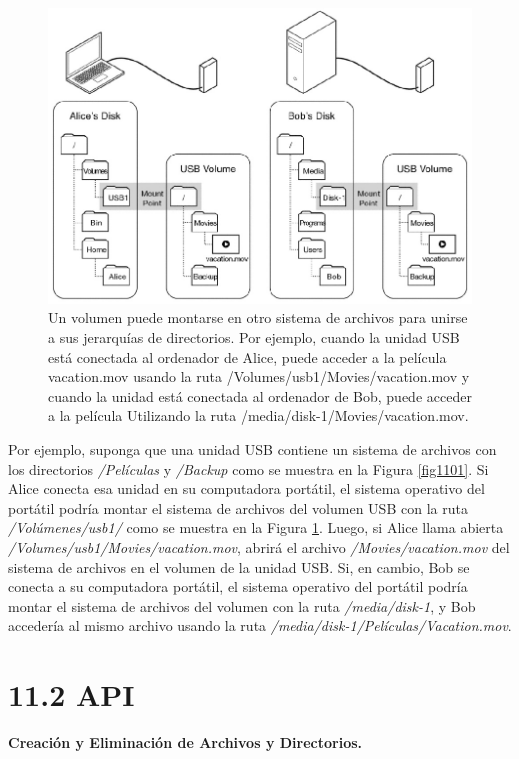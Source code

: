 \documentclass[10pt]{book}
\begin{document}
\begin{figure}[tbhp]
\centerline{\includegraphics[scale=0.70]{img/fig1102}}
\caption{Un volumen puede montarse en otro sistema de archivos para unirse a sus jerarquías de directorios. Por ejemplo, cuando la unidad USB está conectada al ordenador de Alice, puede acceder a la película vacation.mov usando la ruta /Volumes/usb1/Movies/vacation.mov y cuando la unidad está conectada al ordenador de Bob, puede acceder a la película Utilizando la ruta /media/disk-1/Movies/vacation.mov.}
\label{fig1102}
\end{figure}

Por ejemplo, suponga que una unidad USB contiene un sistema de archivos con los directorios \textit{/Películas} y \textit{/Backup} como se muestra en la Figura \ref{fig1101}. Si Alice conecta esa unidad en su computadora portátil, el sistema operativo del portátil podría montar el sistema de archivos del volumen USB con la ruta \textit{/Volúmenes/usb1/} como se muestra en la Figura \ref{fig1102}. Luego, si Alice llama abierta \textit{/Volumes/usb1/Movies/vacation.mov}, abrirá el archivo \textit{/Movies/vacation.mov} del sistema de archivos en el volumen de la unidad USB. Si, en cambio, Bob se conecta a su computadora portátil, el sistema operativo del portátil podría montar el sistema de archivos del volumen con la ruta \textit{/media/disk-1}, y Bob accedería al mismo archivo usando la ruta \textit{/media/disk-1/Películas/Vacation.mov}.


\section{11.2 API}
\textbf{Creación y Eliminación de Archivos y Directorios.}
\end{document}
